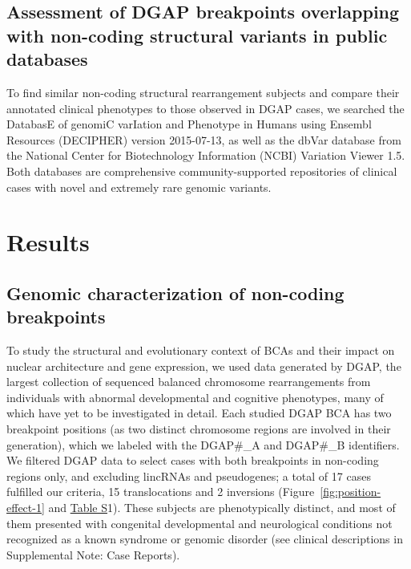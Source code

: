 \documentclass[a4paper,twoside=true,openright,parskip=full,chapterprefix=true,11pt,headings=normal,bibliography=totoc,listof=totoc,titlepage=on,captions=tableabove,draft=false]{scrreprt}
\theoremstyle{definition}
\theoremstyle{definition}
\theoremstyle{definition}
\theoremstyle{remark}
\begin{document}
\hypertarget{assessment-of-dgap-breakpoints-overlapping-with-non-coding-structural-variants-in-public-databases}{%
\subsection{Assessment of DGAP breakpoints overlapping with non-coding
structural variants in public
databases}\label{assessment-of-dgap-breakpoints-overlapping-with-non-coding-structural-variants-in-public-databases}}

To find similar non-coding structural rearrangement subjects and compare
their annotated clinical phenotypes to those observed in DGAP cases, we
searched the DatabasE of genomiC varIation and Phenotype in Humans using
Ensembl Resources (DECIPHER)\citep{Firth2009} version 2015-07-13, as
well as the dbVar database from the National Center for Biotechnology
Information (NCBI) Variation Viewer 1.5.\citep{Lappalainen2013} Both
databases are comprehensive community-supported repositories of clinical
cases with novel and extremely rare genomic variants.

\hypertarget{results-2}{%
\section{Results}\label{results-2}}

\hypertarget{genomic-characterization-of-non-coding-breakpoints}{%
\subsection{Genomic characterization of non-coding
breakpoints}\label{genomic-characterization-of-non-coding-breakpoints}}

To study the structural and evolutionary context of BCAs and their
impact on nuclear architecture and gene expression, we used data
generated by
DGAP,\citep{Higgins2008, Ligon2005, Kim2008, Lu2007, Redin2017} the
largest collection of sequenced balanced chromosome rearrangements from
individuals with abnormal developmental and cognitive phenotypes, many
of which have yet to be investigated in detail. Each studied DGAP BCA
has two breakpoint positions (as two distinct chromosome regions are
involved in their generation), which we labeled with the DGAP\#\_A and
DGAP\#\_B identifiers. We filtered DGAP data to select cases with both
breakpoints in non-coding regions only, and excluding lincRNAs and
pseudogenes; a total of 17 cases fulfilled our criteria, 15
translocations and 2 inversions (Figure~\ref{fig:position-effect-1} and
\protect\hyperlink{position-effect-sub-tab}{Table S}1). These subjects
are phenotypically distinct, and most of them presented with congenital
developmental and neurological conditions not recognized as a known
syndrome or genomic disorder (see clinical descriptions in Supplemental
Note: Case Reports).
\end{document}
